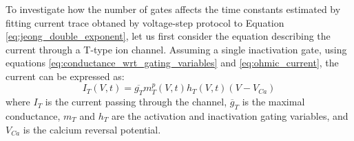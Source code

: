 \documentclass[../main.tex]{subfiles}
\begin{document}
To investigate how the number of gates affects the time constants estimated by fitting current trace obtaned by voltage-step protocol to Equation \ref{eq:jeong_double_exponent}, let us first consider the equation describing the current through a T-type ion channel. Assuming a single inactivation gate, using equations \ref{eq:conductance_wrt_gating_variables} and \ref{eq:ohmic_current}, the current can be expressed as:
\begin{equation}\label{eq:fitting_t_type_current}
    I_T(V,t) = \overline{g_T} m_T^p(V,t) h_T(V,t) (V - V_{Ca})
\end{equation}
where $I_T$ is the current passing through the channel, $\overline{g}_T$ is the maximal conductance, $m_T$ and $h_T$ are the activation and inactivation gating variables, and $V_{Ca}$ is the calcium reversal potential.
\end{document}
